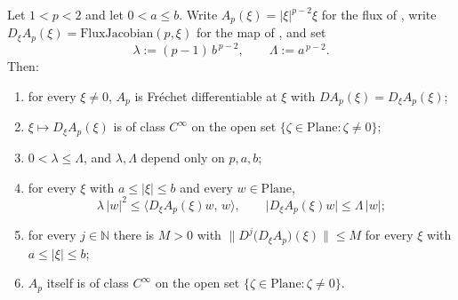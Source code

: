 \begin{lemma}
Let $1<p<2$ and let $0<a\le b$.  Write $A_p(\xi)=\lvert\xi\rvert^{p-2}\xi$ for the flux of
, write $D_\xi A_p(\xi)=\mathrm{FluxJacobian}(p,\xi)$ for the map of
, and set
\[
  \lambda:=(p-1)\,b^{\,p-2},\qquad \Lambda:=a^{\,p-2}.
\]
Then:
\begin{enumerate}
\item for every $\xi\ne0$, $A_p$ is Fr\'echet differentiable at $\xi$ with
  $DA_p(\xi)=D_\xi A_p(\xi)$;
\item $\xi\mapsto D_\xi A_p(\xi)$ is of class $C^{\infty}$ on the open set
  $\{\zeta\in\mathrm{Plane}:\zeta\ne0\}$;
\item $0<\lambda\le\Lambda$, and $\lambda,\Lambda$ depend only on $p,a,b$;
\item for every $\xi$ with $a\le\lvert\xi\rvert\le b$ and every $w\in\mathrm{Plane}$,
\[
  \lambda\,\lvert w\rvert^{2}\le\bigl\langle D_\xi A_p(\xi)w,\,w\bigr\rangle,
  \qquad
  \bigl\lvert D_\xi A_p(\xi)w\bigr\rvert\le\Lambda\,\lvert w\rvert ;
\]
\item for every $j\in\mathbb{N}$ there is $M>0$ with
  $\bigl\lVert D^{j}\bigl(D_\xi A_p\bigr)(\xi)\bigr\rVert\le M$ for every $\xi$ with
  $a\le\lvert\xi\rvert\le b$;
\item $A_p$ itself is of class $C^{\infty}$ on the open set
  $\{\zeta\in\mathrm{Plane}:\zeta\ne0\}$.
\end{enumerate}
\end{lemma}
